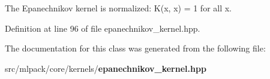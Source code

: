 The Epanechnikov kernel is normalized\-: K(x, x) = 1 for all x. 



Definition at line 96 of file epanechnikov\-\_\-kernel.\-hpp.



The documentation for this class was generated from the following file\-:\begin{DoxyCompactItemize}
\item 
src/mlpack/core/kernels/{\bf epanechnikov\-\_\-kernel.\-hpp}\end{DoxyCompactItemize}
